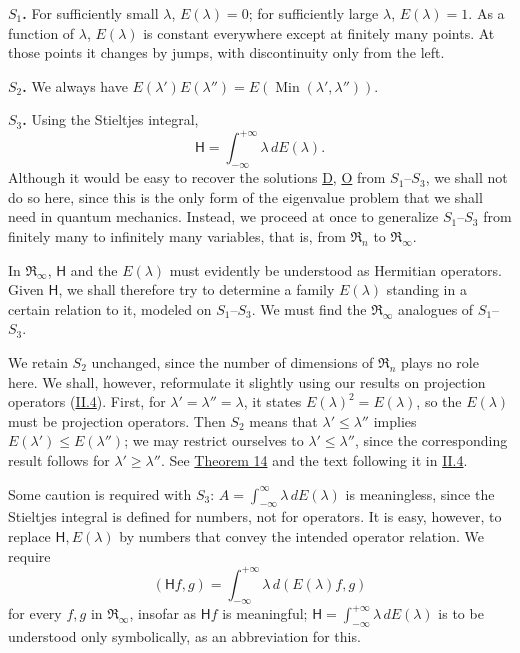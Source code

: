 \documentclass[fontsize=13pt,twoside,openany,headings=normal,parskip=false,bookmarkpackage=false,DIV=calc]{scrbook}
\begin{document}
\leavevmode{}\textbf{$S_1$.}\label{cond:II.S1} For sufficiently small $\lambda$, $E(\lambda)=0$; for sufficiently large $\lambda$, $E(\lambda)=1$. As a function of $\lambda$, $E(\lambda)$ is constant everywhere except at finitely many points. At those points it changes by jumps, with discontinuity only from the left.

\leavevmode{}\textbf{$S_2$.}\label{cond:II.S2} We always have $E(\lambda')E(\lambda'')=E(\operatorname{Min}(\lambda',\lambda''))$.

\leavevmode{}\textbf{$S_3$.}\label{cond:II.S3} Using the Stieltjes integral,
\[
\mathsf H=\int_{-\infty}^{+\infty}\lambda\,dE(\lambda).
\]
Although it would be easy to recover the solutions \hyperref[eq:II.7.D]{D}, \hyperref[eq:II.7.O]{O} from $\hyperref[cond:II.S1]{S_1}$--$\hyperref[cond:II.S3]{S_3}$, we shall not do so here, since this is the only form of the eigenvalue problem that we shall need in quantum mechanics. Instead, we proceed at once to generalize $\hyperref[cond:II.S1]{S_1}$--$\hyperref[cond:II.S3]{S_3}$ from finitely many to infinitely many variables, that is, from $\mathfrak{R}_n$ to $\mathfrak{R}_\infty$.

In $\mathfrak{R}_\infty$, $\mathsf H$ and the $E(\lambda)$ must evidently be understood as Hermitian operators. Given $\mathsf H$, we shall therefore try to determine a family $E(\lambda)$ standing in a certain relation to it, modeled on $\hyperref[cond:II.S1]{S_1}$--$\hyperref[cond:II.S3]{S_3}$. We must find the $\mathfrak{R}_\infty$ analogues of $\hyperref[cond:II.S1]{S_1}$--$\hyperref[cond:II.S3]{S_3}$.

We retain $\hyperref[cond:II.S2]{S_2}$ unchanged, since the number of dimensions of $\mathfrak{R}_n$ plays no role here. We shall, however, reformulate it slightly using our results on projection operators (\hyperref[sec:II.4]{II.4}). First, for $\lambda'=\lambda''=\lambda$, it states $E(\lambda)^2=E(\lambda)$, so the $E(\lambda)$ must be projection operators. Then $\hyperref[cond:II.S2]{S_2}$ means that $\lambda'\leq\lambda''$ implies $E(\lambda')\leq E(\lambda'')$; we may restrict ourselves to $\lambda'\leq\lambda''$, since the corresponding result follows for $\lambda'\geq\lambda''$. See \hyperref[thm:II.14]{Theorem 14} and the text following it in \hyperref[sec:II.4]{II.4}.

\hypertarget{origpage-60}{}%
Some caution is required with $\hyperref[cond:II.S3]{S_3}$: $A=\int_{-\infty}^{\infty}\lambda\,dE(\lambda)$ is meaningless, since the Stieltjes integral is defined for numbers, not for operators. It is easy, however, to replace $\mathsf H,E(\lambda)$ by numbers that convey the intended operator relation. We require
\[
(\mathsf Hf,g)=\int_{-\infty}^{+\infty}\lambda\,d(E(\lambda)f,g)
\]
for every $f,g$ in $\mathfrak{R}_\infty$, insofar as $\mathsf Hf$ is meaningful; $\mathsf H=\int_{-\infty}^{+\infty}\lambda\,dE(\lambda)$ is to be understood only symbolically, as an abbreviation for this.
\end{document}
